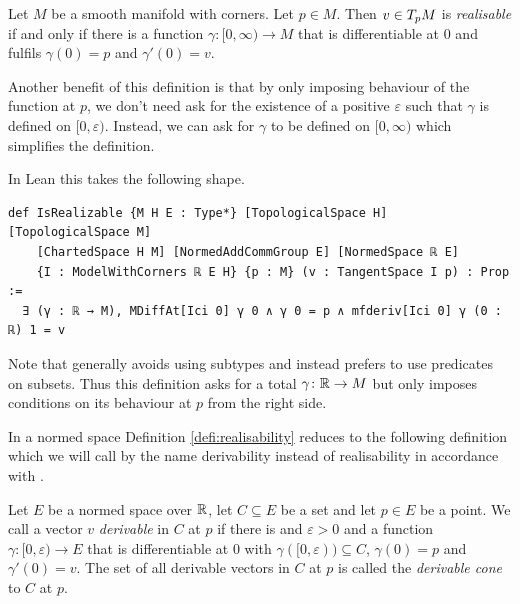 \begin{defi}[Realisability]\label{defi:realisability}
    Let $M$ be a smooth manifold with corners. Let $p \in M$. Then $v \in T_{p}M$ is \emph{realisable} if and only if there is a function $\gamma \colon [0, \infty) \to M$ that is differentiable at $0$ and fulfils $\gamma (0) = p$ and $\gamma'(0) = v$.
\end{defi}

Another benefit of this definition is that by only imposing behaviour of the function at $p$, we don't need ask for the existence of a positive $\varepsilon$ such that $\gamma$ is defined on $[0, \varepsilon)$. 
Instead, we can ask for $\gamma$ to be defined on $[0, \infty)$ which simplifies the definition. 

In Lean this takes the following shape. 

\begin{lstlisting}
def IsRealizable {M H E : Type*} [TopologicalSpace H] [TopologicalSpace M] 
    [ChartedSpace H M] [NormedAddCommGroup E] [NormedSpace ℝ E]
    {I : ModelWithCorners ℝ E H} {p : M} (v : TangentSpace I p) : Prop :=
  ∃ (γ : ℝ → M), MDiffAt[Ici 0] γ 0 ∧ γ 0 = p ∧ mfderiv[Ici 0] γ (0 : ℝ) 1 = v
\end{lstlisting}

Note that \mathlib generally avoids using subtypes and instead prefers to use predicates on subsets. 
Thus this definition asks for a total $\gamma \colon \mathbb{R} \to M$ but only imposes conditions on its behaviour at $p$ from the right side. 


In a normed space Definition \ref{defi:realisability} reduces to the following definition which we will call by the name derivability instead of realisability in accordance with \cite{Rockafellar1998}.

\begin{defi}\label{defi:derivability}
Let $E$ be a normed space over $\mathbb{R}$, let $C \subseteq E$ be a set and let $p \in E$ be a point. 
We call a vector $v$ \emph{derivable} in $C$ at $p$ if there is and $\varepsilon > 0$ and a function $\gamma \colon [0, \varepsilon) \to E$ that is differentiable at $0$ with $\gamma ([0, \varepsilon)) \subseteq C$, $\gamma (0) = p$ and $\gamma' (0) = v$. 
The set of all derivable vectors in $C$ at $p$ is called the \emph{derivable cone} to $C$ at $p$. 
\end{defi}

